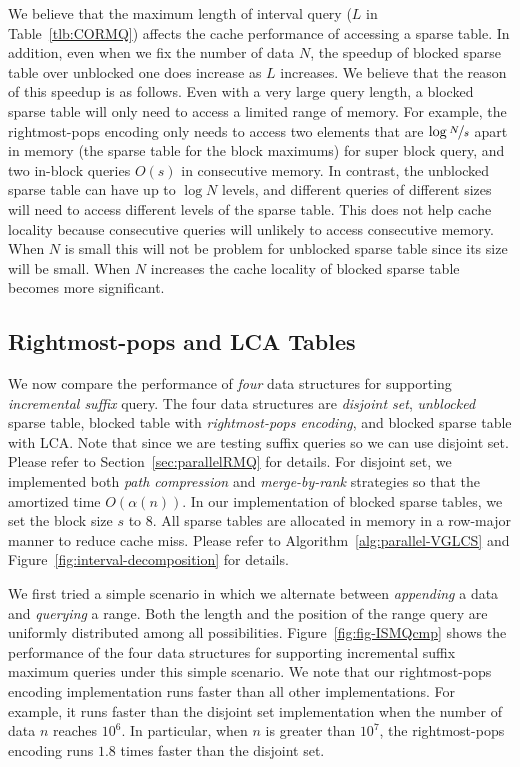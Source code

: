 We believe that the maximum length of interval query ($L$ in
Table~\ref{tlb:CORMQ}) affects the cache performance of accessing a
sparse table.  In addition, even when we fix the number of data $N$, the
speedup of blocked sparse table over unblocked one does increase as $L$
increases.  We believe that the reason of this speedup is as follows.
Even with a very large query length, a blocked sparse table will only
need to access a limited range of memory.  For example, the
rightmost-pops encoding only needs to access two elements that are
$\log{\nicefrac{N}{s}}$ apart in memory (the sparse table for the block
maximums) for super block query, and two in-block queries $O(s)$ in
consecutive memory.  In contrast, the unblocked sparse table can have up
to $\log N$ levels, and different queries of different sizes will need
to access different levels of the sparse table.  This does not help
cache locality because consecutive queries will unlikely to access
consecutive memory.  When $N$ is small this will not be problem for
unblocked sparse table since its size will be small.  When $N$ increases
the cache locality of blocked sparse table becomes more significant.




\subsection{Rightmost-pops and LCA Tables}

We now compare the performance of {\em four} data structures for
supporting {\em incremental suffix} query.  The four data structures
are {\em disjoint set}, {\em unblocked} sparse table, blocked table
with {\em rightmost-pops encoding}, and blocked sparse table with
LCA. Note that since we are testing suffix queries so we can use
disjoint set.  Please refer to Section~\ref{sec:parallelRMQ} for
details. For disjoint set, we implemented both {\em path compression}
and {\em merge-by-rank} strategies so that the amortized time
$O(\alpha(n))$. In our implementation of blocked sparse tables, we set
the block size $s$ to $8$.  All sparse tables are allocated in memory
in a row-major manner to reduce cache miss.  Please refer to
Algorithm~\ref{alg:parallel-VGLCS} and
Figure~\ref{fig:interval-decomposition} for details.


We first tried a simple scenario in which we alternate between {\em
  appending} a data and {\em querying} a range.  Both the length and
the position of the range query are uniformly distributed among all
possibilities.  Figure~\ref{fig:fig-ISMQcmp} shows the performance of
the four data structures for supporting incremental suffix maximum
queries under this simple scenario.  We note that our rightmost-pops
encoding implementation runs faster than all other
implementations. For example, it runs faster than the disjoint set
implementation when the number of data $n$ reaches $10^6$.  In
particular, when $n$ is greater than $10^7$, the rightmost-pops
encoding runs $1.8$ times faster than the disjoint set.


